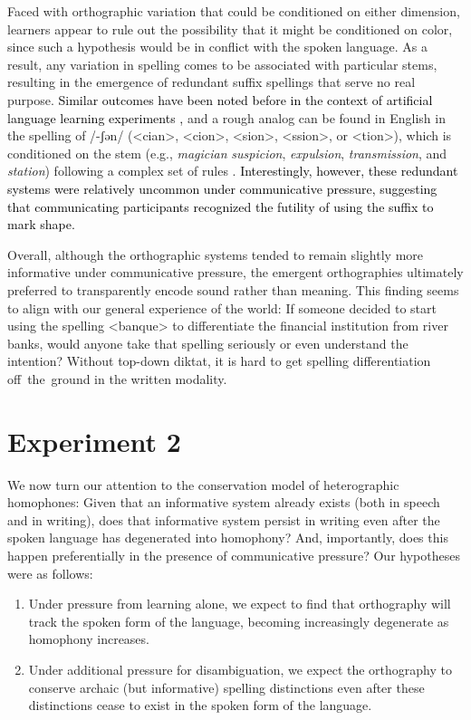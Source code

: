 \documentclass[doc,biblatex]{apa7}
\newcommand\newmaterial[1]{\textcolor{black}{#1}}
\begin{document}
Faced with orthographic variation that could be conditioned on either dimension, learners appear to rule out the possibility that it might be conditioned on color, since such a hypothesis would be in conflict with the spoken language. As a result, any variation in spelling comes to be associated with particular stems, resulting in the emergence of redundant suffix spellings that serve no real purpose. \newmaterial{Similar outcomes have been noted before in the context of artificial language learning experiments \parencite{Smith:2010},} and a rough analog can be found in English in the spelling of /-ʃən/ (<cian>, <cion>, <sion>, <ssion>, or <tion>), which is conditioned on the stem (e.g., \textit{magician} \textit{suspicion}, \textit{expulsion}, \textit{transmission}, and \textit{station}) following a complex set of rules \parencite[pp.~420--421]{Carney:1994}. \newmaterial{Interestingly, however, these redundant systems were relatively uncommon under communicative pressure, suggesting that communicating participants recognized the futility of using the suffix to mark shape.}

Overall, although the orthographic systems tended to remain slightly more informative under communicative pressure, the emergent orthographies ultimately preferred to transparently encode sound rather than meaning. This finding seems to align with our general experience of the world: If someone decided to start using the spelling <banque> to differentiate the financial institution from river banks, would anyone take that spelling seriously or even understand the intention? Without top-down diktat, it is hard to get spelling differentiation off~the~ground in the written modality.


\section{Experiment 2}

We now turn our attention to the conservation model of heterographic homophones: Given that an informative system already exists (both in speech and in writing), does that informative system persist in writing even after the spoken language has degenerated into homophony? And, importantly, does this happen preferentially in the presence of communicative pressure? Our hypotheses were as follows:
\begin{enumerate}
	\item Under pressure from learning alone, we expect to find that orthography will track the spoken form of the language, becoming increasingly degenerate as homophony increases.
	\item Under additional pressure for disambiguation, we expect the orthography to conserve archaic (but informative) spelling distinctions even after these distinctions cease to exist in the spoken form of the language.
\end{enumerate}
\end{document}
